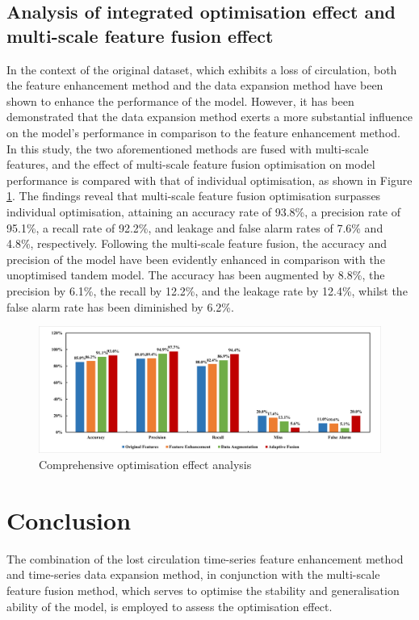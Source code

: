 \documentclass[journal,article,submit,pdftex,moreauthors]{Definitions/mdpi}
\begin{document}
\subsection{Analysis of integrated optimisation effect and multi-scale feature fusion effect}

In the context of the original dataset, which exhibits a loss of circulation, both the feature enhancement method and the data expansion method have been shown to enhance the performance of the model. However, it has been demonstrated that the data expansion method exerts a more substantial influence on the model's performance in comparison to the feature enhancement method. In this study, the two aforementioned methods are fused with multi-scale features, and the effect of multi-scale feature fusion optimisation on model performance is compared with that of individual optimisation, as shown in Figure \ref{fig:Comprehensive optimisation effect analysis}. The findings reveal that multi-scale feature fusion optimisation surpasses individual optimisation, attaining an accuracy rate of 93.8\%, a precision rate of 95.1\%, a recall rate of 92.2\%, and leakage and false alarm rates of 7.6\% and 4.8\%, respectively. Following the multi-scale feature fusion, the accuracy and precision of the model have been evidently enhanced in comparison with the unoptimised tandem model. The accuracy has been augmented by 8.8\%, the precision by 6.1\%, the recall by 12.2\%, and the leakage rate by 12.4\%, whilst the false alarm rate has been diminished by 6.2\%.

\begin{figure}[H]
    \centering
    \includegraphics[width=1\linewidth]{图片/综合图像.png}
    \caption{Comprehensive optimisation effect analysis}
    \label{fig:Comprehensive optimisation effect analysis}
\end{figure}
\section{Conclusion}
The combination of the lost circulation time-series feature enhancement method and time-series data expansion method, in conjunction with the multi-scale feature fusion method, which serves to optimise the stability and generalisation ability of the model, is employed to assess the optimisation effect.
\end{document}
